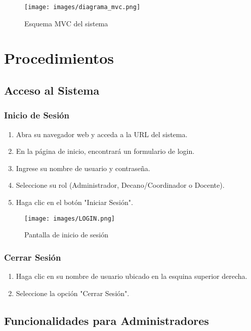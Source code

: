 \documentclass[12pt,a4paper]{article}
\begin{document}
\begin{figure}[H]
  \centering
  \texttt{[image: images/diagrama\_mvc.png]}
  \caption{Esquema MVC del sistema}
  \label{fig:mvc}
\end{figure}


\section{Procedimientos}\label{sec:procedimientos}
\subsection{Acceso al Sistema}
\subsubsection{Inicio de Sesión}
\begin{enumerate}
    \item Abra su navegador web y acceda a la URL del sistema.
    \item En la página de inicio, encontrará un formulario de login.
    \item Ingrese su nombre de usuario y contraseña.
    \item Seleccione su rol (Administrador, Decano/Coordinador o Docente).
    \item Haga clic en el botón "Iniciar Sesión".
\end{enumerate}

\begin{figure}[H]
  \centering
  \texttt{[image: images/LOGIN.png]}
  \caption{Pantalla de inicio de sesión}
  \label{fig:login}
\end{figure}


\subsubsection{Cerrar Sesión}
\begin{enumerate}
    \item Haga clic en su nombre de usuario ubicado en la esquina superior derecha.
    \item Seleccione la opción "Cerrar Sesión".
\end{enumerate}

\subsection{Funcionalidades para Administradores}
\end{document}

